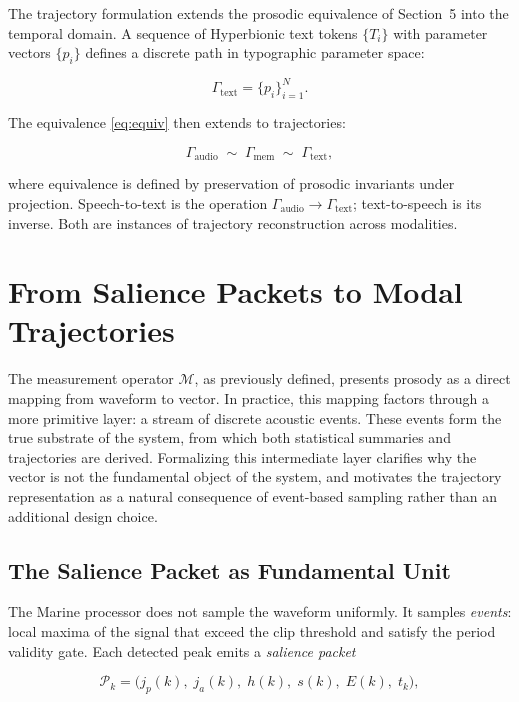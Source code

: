 \documentclass[12pt, a4paper]{article}
\begin{document}
The trajectory formulation extends the prosodic equivalence of Section~5 into the temporal domain. A sequence of Hyperbionic text tokens $\{T_i\}$ with parameter vectors $\{p_i\}$ defines a discrete path in typographic parameter space:

\begin{equation}
\Gamma_{\mathrm{text}} = \{p_i\}_{i=1}^N.
\label{eq:Gtext}
\end{equation}

The equivalence \eqref{eq:equiv} then extends to trajectories:

\begin{equation}
\Gamma_{\mathrm{audio}} \;\sim\; \Gamma_{\mathrm{mem}} \;\sim\; \Gamma_{\mathrm{text}},
\label{eq:trajequiv}
\end{equation}

where equivalence is defined by preservation of prosodic invariants under projection. Speech-to-text is the operation $\Gamma_{\mathrm{audio}} \to \Gamma_{\mathrm{text}}$; text-to-speech is its inverse. Both are instances of trajectory reconstruction across modalities.


\section{From Salience Packets to Modal Trajectories}

The measurement operator $\mathcal{M}$, as previously defined, presents prosody as a direct mapping from waveform to vector. In practice, this mapping factors through a more primitive layer: a stream of discrete acoustic events. These events form the true substrate of the system, from which both statistical summaries and trajectories are derived. Formalizing this intermediate layer clarifies why the vector is not the fundamental object of the system, and motivates the trajectory representation as a natural consequence of event-based sampling rather than an additional design choice.

\subsection{The Salience Packet as Fundamental Unit}

The Marine processor does not sample the waveform uniformly. It samples \emph{events}: local maxima of the signal that exceed the clip threshold and satisfy the period validity gate. Each detected peak emits a \emph{salience packet}

\begin{equation}
\mathcal{P}_k = \bigl(j_p(k),\; j_a(k),\; h(k),\; s(k),\; E(k),\; t_k\bigr),
\label{eq:packet}
\end{equation}
\end{document}
